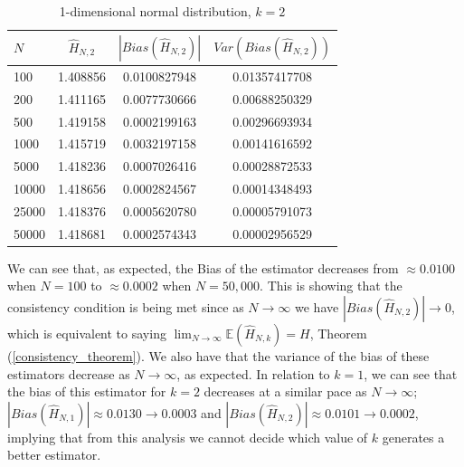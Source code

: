 \documentclass{article}
\begin{document}
\begin{table}
\caption{1-dimensional normal distribution, $k=2$} \label{normal_k=2_table}
\begin{center}
\begin{tabular}{| l | c c c|} 
\toprule
$N$ & $\hat{H}_{N, 2}$ & $|Bias(\hat{H}_{N, 2})|$ & $Var(Bias(\hat{H}_{N, 2}))$ \\
\midrule[1pt]
100     & 1.408856     & 0.0100827948     & 0.01357417708  \\
200     & 1.411165     & 0.0077730666     & 0.00688250329  \\
500     & 1.419158     & 0.0002199163     & 0.00296693934  \\
1000    & 1.415719     & 0.0032197158     & 0.00141616592  \\
5000    & 1.418236     & 0.0007026416     & 0.00028872533  \\
10000   & 1.418656     & 0.0002824567     & 0.00014348493  \\
25000   & 1.418376     & 0.0005620780     & 0.00005791073  \\
50000   & 1.418681     & 0.0002574343     & 0.00002956529  \\
\hline
\end{tabular}
\end{center}
\end{table}

We can see that, as expected, the Bias of the estimator decreases from $\approx 0.0100$ when $N=100$ to $\approx 0.0002$ when $N=50,000$. This is showing that the consistency condition is being met since as $N \to \infty$ we have $|Bias(\hat{H}_{N, 2})| \to 0$, which is equivalent to saying $\lim_{N \to \infty} \mathbb{E} (\hat{H}_{N, k}) = H$, Theorem (\ref{consistency_theorem}). We also have that the variance of the bias of these estimators decrease as $N \to \infty$, as expected. In relation to $k=1$, we can see that the bias of this estimator for $k=2$ decreases at a similar pace as $N \to \infty$; $|Bias(\hat{H}_{N, 1})| \approx 0.0130 \to 0.0003$ and $|Bias(\hat{H}_{N, 2})| \approx 0.0101 \to 0.0002$, implying that from this analysis we cannot decide which value of $k$ generates a better estimator.
\end{document}
